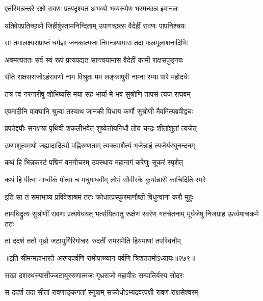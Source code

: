\twolineshloka
{एतस्मिन्नन्तरे रक्षो रावणः प्रत्यदृश्यत}
{अभव्यो भव्यरूपेण भस्मच्छन्न इवानलः}


\twolineshloka
{यतिवेपप्रतिच्छन्नो जिहीर्षुस्तामनिन्दिताम्}
{उपागच्छत्स वैदेहीं रावणः पापनिश्चयः}


\twolineshloka
{सा तमालक्ष्यसप्राप्तं धर्मज्ञा जनकात्मजा}
{निमन्त्रयामास तदा फलमूलाशनादिभिः}


\twolineshloka
{अवमत्यततः सर्वं स्वं रूपं प्रत्यपद्यत}
{सान्त्वयामास वैदेहीं कामी राक्षसपुङ्गवः}


\twolineshloka
{सीते राक्षसराजोऽहंरावणो नाम विश्रुतः}
{मम लङ्कापुरी नाम्ना रम्या पारे महोदधेः}


\twolineshloka
{तत्र त्वं नरनारीषु शोभिष्यसि मया सह}
{भार्या मे भव सुश्रोणि तापसं त्यज राघवम्}


\twolineshloka
{एवमादीनि वाक्यानि श्रुत्वा तस्याथ जानकी}
{पिधाय कर्णौ सुश्रोणी मैवमित्यब्रवीद्वचः}


\twolineshloka
{प्रपतेद्द्यौः सनक्षत्रा पृथिवी शकलीभवेत्}
{शुष्येत्तोयनिधौ तोयं चन्द्रः शीतांशुतां त्यजेत्}


\twolineshloka
{उष्णांशुत्वमथो जह्यादादित्यो वह्निरुष्णताम्}
{त्यक्त्वाशैत्यं भजेन्नाहं त्यजेयंरघुनन्दनम्}


\twolineshloka
{कथं हि भिन्नकरटं पद्मिनं वनगोचरम्}
{उपस्थाय महानागं करेणुः सूकरं स्पृशेत्}


\twolineshloka
{कथं हि पीत्वा माध्वीकं पीत्वा च मधुमाधवीम्}
{लोभं सौवीरके कुर्यान्नारी काचिदिति स्मरेः}


\twolineshloka
{इति सा तं समाभाष्य प्रविवेशाश्रमं ततः}
{क्रोधात्प्रस्फुरमाणौष्ठी विधुन्वाना करौ मुहुः}


तामधिद्रुत्य सुश्रोणीं रावणः प्रत्यषेधयत्
\twolineshloka
{भर्त्सयित्वातु रूक्षेण स्वरेण गतचेतनाम्}
{मूर्धजेषु निजग्राह ऊर्ध्वमाचक्रमे ततः}


\twolineshloka
{तां ददर्श ततो गृध्रो जटायुर्गिरिगोचरः}
{रुदतीं रामरामेति हियमाणां तपस्विनीम्}


॥इति श्रीमन्महाभारते अरण्यपर्वणि रामोपाख्यान-पर्वणि त्रिशततमोऽध्यायः॥२७९॥

\storymeta

\resetShloka



\twolineshloka
{सखा दशरथस्यासीज्जटायुररुणात्मजः}
{गृध्रराजो महावीरः सम्पातिर्यस्य सोदरः}


\twolineshloka
{स ददर्श तदा सीतां रावणाङ्कगतां स्नुषाम्}
{सक्रोधोऽभ्यद्रवत्पक्षी रावणं राक्षसेश्वरम्}


